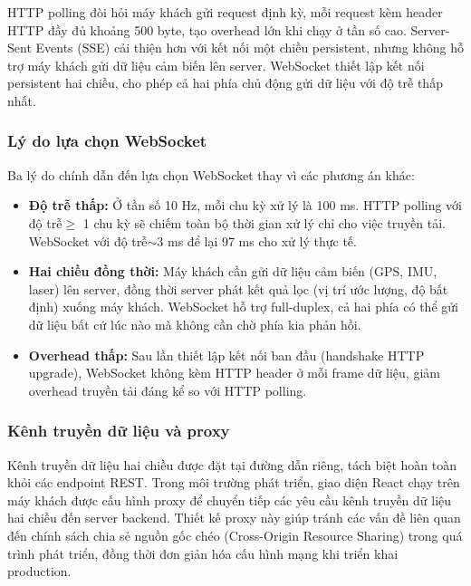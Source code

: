 HTTP polling đòi hỏi máy khách gửi request định kỳ, mỗi request kèm header HTTP đầy đủ khoảng 500 byte, tạo overhead lớn khi chạy ở tần số cao. Server-Sent Events (SSE) cải thiện hơn với kết nối một chiều persistent, nhưng không hỗ trợ máy khách gửi dữ liệu cảm biến lên server. WebSocket thiết lập kết nối persistent hai chiều, cho phép cả hai phía chủ động gửi dữ liệu với độ trễ thấp nhất.

\subsubsection{Lý do lựa chọn WebSocket}

\hspace{0.5cm} Ba lý do chính dẫn đến lựa chọn WebSocket thay vì các phương án khác:

\begin{itemize}
    \item \textbf{Độ trễ thấp:} Ở tần số 10 Hz, mỗi chu kỳ xử lý là 100 ms. HTTP polling với độ trễ$\geq$ 1 chu kỳ sẽ chiếm toàn bộ thời gian xử lý chỉ cho việc truyền tải. WebSocket với độ trễ$\sim$3 ms để lại 97 ms cho xử lý thực tế.

    \item \textbf{Hai chiều đồng thời:} Máy khách cần gửi dữ liệu cảm biến (GPS, IMU, laser) lên server, đồng thời server phát kết quả lọc (vị trí ước lượng, độ bất định) xuống máy khách. WebSocket hỗ trợ full-duplex, cả hai phía có thể gửi dữ liệu bất cứ lúc nào mà không cần chờ phía kia phản hồi.

    \item \textbf{Overhead thấp:} Sau lần thiết lập kết nối ban đầu (handshake HTTP upgrade), WebSocket không kèm HTTP header ở mỗi frame dữ liệu, giảm overhead truyền tải đáng kể so với HTTP polling.
\end{itemize}

\subsubsection{Kênh truyền dữ liệu và proxy}

\hspace{0.5cm} Kênh truyền dữ liệu hai chiều được đặt tại đường dẫn riêng, tách biệt hoàn toàn khỏi các endpoint REST. Trong môi trường phát triển, giao diện React chạy trên máy khách được cấu hình proxy để chuyển tiếp các yêu cầu kênh truyền dữ liệu hai chiều đến server backend. Thiết kế proxy này giúp tránh các vấn đề liên quan đến chính sách chia sẻ nguồn gốc chéo (Cross-Origin Resource Sharing) trong quá trình phát triển, đồng thời đơn giản hóa cấu hình mạng khi triển khai production.

